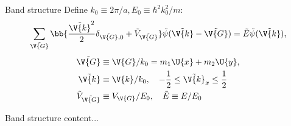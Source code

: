 \documentclass{beamer}
\begin{document}
\begin{frame}{Band structure}
Define $ k_0 \equiv 2\pi/a, E_0 \equiv \hbar^2 k_0^2/m $:
\begin{equation*}
	\sum_{\tilde{\V{G}}} \bb{\frac{\tilde{\V{k}}^2}{2} \delta_{\tilde{\V{G}},0} + \tilde{V}_{\tilde{\V{G}}}} \tilde{\psi}(\tilde{\V{k}} - \tilde{\V{G}}) = \tilde{E} \tilde{\psi}(\tilde{\V{k}}),
\end{equation*}
\begin{align*}
	\tilde{\V{G}} &\equiv \V{G}/k_0 = m_1 \U{x}+m_2 \U{y}, \\
	\tilde{\V{k}} &\equiv \V{k}/k_0, \quad -\frac{1}{2} \leq \tilde{\V{k}}_x \leq \frac{1}{2}\\
	\tilde{V}_{\tilde{\V{G}}} &\equiv V_{\V{G}} / E_0, \quad \tilde{E} \equiv E/E_0
\end{align*}
\end{frame}


\begin{frame}{Band structure}
	content...
\end{frame}
\end{document}
